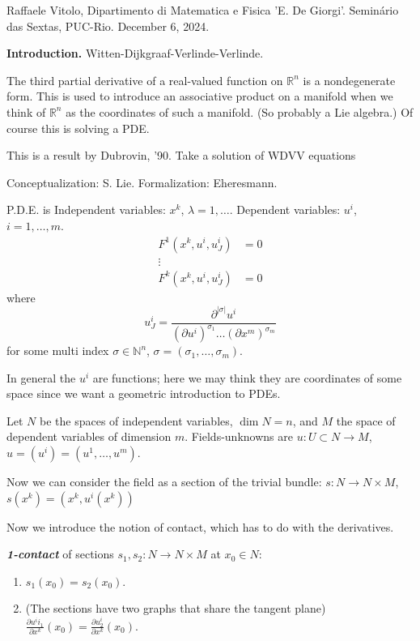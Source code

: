 \noindent
Raffaele Vitolo, Dipartimento di Matematica
e Fisica 'E. De Giorgi'.
Semin\'ario das Sextas, PUC-Rio.
December 6, 2024.

\bigskip\noindent
{\bf Introduction.}
Witten-Dijkgraaf-Verlinde-Verlinde.

The third partial derivative of a real-valued
function on $\mathbb{R}^n$ is a nondegenerate
form. This is used to introduce an
associative product on a manifold when we
think of $\mathbb{R}^n$ as the coordinates of
such a manifold. (So probably a Lie algebra.)
Of course this is solving a PDE.

This is a result by Dubrovin, '90. Take a
solution of WDVV equations

\medskip{}
Conceptualization: S. Lie. Formalization:
Eheresmann.

P.D.E. is
Independent variables: $x^k$,
$\lambda=1,\ldots$. Dependent variables:
$u^i$, $i=1,\ldots,m$.
$$
\begin{aligned}
F^1(x^k,u^i,u^i_J)&=0\\
\vdots \\
F^k(x^k,u^i,u^i_J)&=0
\end{aligned}
$$
where
$$u^i_J=\frac{\partial^{|\sigma|}u^i}
{(\partial
u^i)^{\sigma_1}\ldots(\partial
x^m)^{\sigma_m}}$$
for some multi index $\sigma \in
\mathbb{N}^n$,
$\sigma=(\sigma_1,\ldots,\sigma_m)$.

In general the $u^i$ are functions; here we
may think they are coordinates of some space
since we want a geometric introduction to
PDEs.

Let $N$ be the spaces of independent
variables, $\dim N=n$, and  $M$ the space of
dependent variables of dimension $m$.
Fields-unknowns are $u:U \subset N \to M$,
$u=(u^i)=(u^1,\ldots,u^m)$.

Now we can consider the field as a section of
the trivial bundle: $s:N \to N\times M$,
$s(x^k)=(x^k,u^i(x^k))$

Now we introduce the notion of contact, which
has to do with the derivatives.

{\it\bf 1-contact} of sections $s_1,s_2:N \to
N \times M$ at $x_0  \in N$:
\begin{enumerate}
\item[(0)] $s_1(x_0)=s_2(x_0)$.
\item (The sections have two graphs that
share the tangent plane) $\frac{\partial
u^ii_1}{\partial x^k}(x_0)=\frac{\partial
u^i_2}{\partial x^k}(x_0)$.
\end{enumerate}

